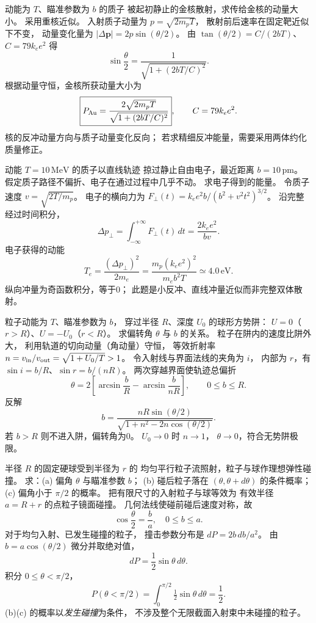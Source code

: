 动能为 $T$、瞄准参数为 $b$ 的质子
被起初静止的金核散射，求传给金核的动量大小。
采用重核近似。
\exsolution
入射质子动量为 $p=\sqrt{2m_pT}$，
散射前后速率在固定靶近似下不变，
动量变化量为
$|\Delta\boldsymbol p|=2p\sin(\theta/2)$。
由
$\tan(\theta/2)=C/(2bT)$、
$C=79k_e e^2$ 得
\[
 \sin\frac\theta2=
 \frac1{\sqrt{1+(2bT/C)^2}}.
\]
根据动量守恒，金核所获动量大小为
\[
 \boxed{P_{\rm Au}=
 \frac{2\sqrt{2m_pT}}{\sqrt{1+(2bT/C)^2}}},
 \qquad C=79k_e e^2.
\]
\excheck 核的反冲动量方向与质子动量变化反向；
若求精细反冲能量，需要采用两体约化质量修正。

动能 $T=10\,\mathrm{MeV}$ 的质子以直线轨迹
掠过静止自由电子，最近距离 $b=10\,\mathrm{pm}$。
假定质子路径不偏折、电子在通过过程中几乎不动。
求电子得到的能量。
\exsolution
令质子速度
$v=\sqrt{2T/m_p}$。
电子的横向力为
$F_\perp(t)=k_ee^2 b/(b^2+v^2t^2)^{3/2}$。
沿完整经过时间积分，
\[
 \Delta p_\perp=\int_{-\infty}^{+\infty}F_\perp(t)\,dt
 =\frac{2k_ee^2}{bv}.
\]
电子获得的动能
\[
 T_e=\frac{(\Delta p_\perp)^2}{2m_e}
 =\boxed{\frac{m_p(k_ee^2)^2}{m_eb^2T}
 \simeq4.0\,\mathrm{eV}}.
\]
\excheck 纵向冲量为奇函数积分，等于0；
此题是小反冲、直线冲量近似而非完整双体散射。

粒子动能为 $T$、瞄准参数为 $b$，
穿过半径 $R$、深度 $U_0$ 的球形方势阱：
$U=0$（$r>R$）、$U=-U_0$（$r<R$）。
求偏转角 $\theta$ 与 $b$ 的关系。
\exsolution
粒子在阱内的速度比阱外大，
利用轨道的切向动量（角动量）守恒，
等效折射率
$n=v_{\rm in}/v_{\rm out}
=\sqrt{1+U_0/T}>1$。
令入射线与界面法线的夹角为 $i$，
内部为 $r$，有
$\sin i=b/R$、$\sin r=b/(nR)$。
两次穿越界面使轨迹总偏折
\[
 \boxed{\theta=
 2\left[\arcsin\frac bR-
 \arcsin\frac b{nR}\right]},
 \qquad 0\le b\le R.
\]
反解
\[
 \boxed{b=\frac{nR\sin(\theta/2)}
 {\sqrt{1+n^2-2n\cos(\theta/2)}}}.
\]
若 $b>R$ 则不进入阱，偏转角为0。
\excheck $U_0\to0$ 时 $n\to1$，
$\theta\to0$，符合无势阱极限。

半径 $R$ 的固定硬球受到半径为 $r$ 的
均匀平行粒子流照射，粒子与球作理想弹性碰撞。
求：(a) 偏角 $\theta$ 与瞄准参数 $b$；
(b) 碰后粒子落在 $(\theta,\theta+d\theta)$ 的条件概率；
(c) 偏角小于 $\pi/2$ 的概率。
\exsolution
把有限尺寸的入射粒子与球等效为
有效半径 $a=R+r$ 的点粒子镜面碰撞。
几何法线使碰前碰后速度对称，故
\[
 \boxed{\cos\frac\theta2=\frac ba},\quad 0\le b\le a.
\]
对于均匀入射、已发生碰撞的粒子，
撞击参数分布是
$dP=2b\,db/a^2$。
由 $b=a\cos(\theta/2)$ 微分并取绝对值，
\[
 \boxed{dP=\frac12\sin\theta\,d\theta}.
\]
积分 $0\le\theta<\pi/2$，
\[
 \boxed{P(\theta<\pi/2)=
 \int_0^{\pi/2}\tfrac12\sin\theta\,d\theta=\frac12}.
\]
\excheck (b)(c) 的概率以\emph{发生碰撞}为条件，
不涉及整个无限截面入射束中未碰撞的粒子。

